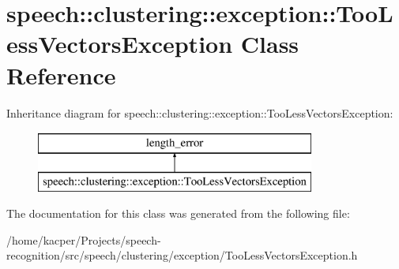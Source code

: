 \hypertarget{classspeech_1_1clustering_1_1exception_1_1TooLessVectorsException}{\section{speech\+:\+:clustering\+:\+:exception\+:\+:Too\+Less\+Vectors\+Exception Class Reference}
\label{classspeech_1_1clustering_1_1exception_1_1TooLessVectorsException}
}
Inheritance diagram for speech\+:\+:clustering\+:\+:exception\+:\+:Too\+Less\+Vectors\+Exception\+:\begin{figure}[H]
\begin{center}
\leavevmode
\includegraphics[height=2.000000cm]{classspeech_1_1clustering_1_1exception_1_1TooLessVectorsException}
\end{center}
\end{figure}


The documentation for this class was generated from the following file\+:\begin{DoxyCompactItemize}
\item 
/home/kacper/\+Projects/speech-\/recognition/src/speech/clustering/exception/Too\+Less\+Vectors\+Exception.\+h\end{DoxyCompactItemize}
